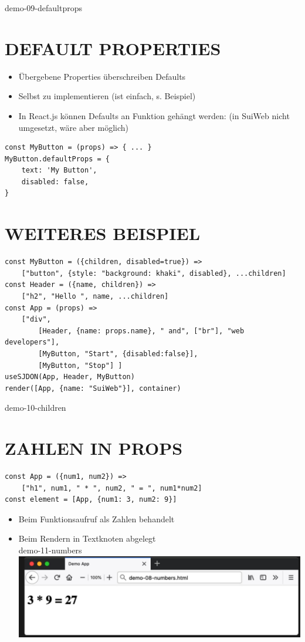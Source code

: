 \documentclass[10pt]{article}
\begin{document}
demo-09-defaultprops

\section*{DEFAULT PROPERTIES}
\begin{itemize}
  \item Übergebene Properties überschreiben Defaults
  \item Selbst zu implementieren (ist einfach, s. Beispiel)
  \item In React.js können Defaults an Funktion gehängt werden: (in SuiWeb nicht umgesetzt, wäre aber möglich)
\end{itemize}

\begin{verbatim}
const MyButton = (props) => { ... }
MyButton.defaultProps = {
    text: 'My Button',
    disabled: false,
}
\end{verbatim}

\section*{WEITERES BEISPIEL}
\begin{verbatim}
const MyButton = ({children, disabled=true}) =>
    ["button", {style: "background: khaki", disabled}, ...children]
const Header = ({name, children}) =>
    ["h2", "Hello ", name, ...children]
const App = (props) =>
    ["div",
        [Header, {name: props.name}, " and", ["br"], "web developers"],
        [MyButton, "Start", {disabled:false}],
        [MyButton, "Stop"] ]
useSJDON(App, Header, MyButton)
render([App, {name: "SuiWeb"}], container)
\end{verbatim}

demo-10-children

\section*{ZAHLEN IN PROPS}
\begin{verbatim}
const App = ({num1, num2}) =>
    ["h1", num1, " * ", num2, " = ", num1*num2]
const element = [App, {num1: 3, num2: 9}]
\end{verbatim}

\begin{itemize}
  \item Beim Funktionsaufruf als Zahlen behandelt
  \item Beim Rendern in Textknoten abgelegt\\
demo-11-numbers\\
\includegraphics[width=\linewidth]{images/2025_01_02_254b5e4c52d090c313e1g-40}
\end{itemize}
\end{document}
